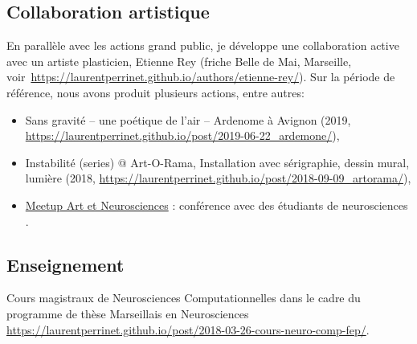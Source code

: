 \subsection{Collaboration artistique} %

En parallèle avec les actions grand public, je développe une collaboration active avec un artiste plasticien, Etienne Rey (friche Belle de Mai, Marseille, voir~\url{https://laurentperrinet.github.io/authors/etienne-rey/}). Sur la période de référence, nous avons produit plusieurs actions, entre autres:

\begin{itemize}
	\item Sans gravité – une poétique de l’air – Ardenome à Avignon (2019, \url{https://laurentperrinet.github.io/post/2019-06-22_ardemone/}), 		\item Instabilité (series) @ Art-O-Rama, Installation avec sérigraphie, dessin mural, lumière (2018, \url{https://laurentperrinet.github.io/post/2018-09-09_artorama/}), 
	\item \href{https://laurentperrinet.github.io/talk/2018-01-25-meetup-neuronautes/}{Meetup Art et Neurosciences} : conférence avec des étudiants de neurosciences . 

\end{itemize}


\subsection{Enseignement} %

Cours magistraux de Neurosciences Computationnelles  dans le cadre du programme de thèse Marseillais en Neurosciences \url{https://laurentperrinet.github.io/post/2018-03-26-cours-neuro-comp-fep/}.

